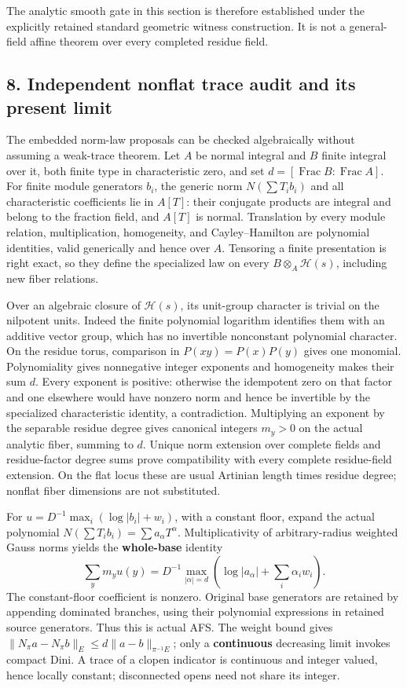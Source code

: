 \documentclass[
  10pt,
]{article}
\begin{document}
The analytic smooth gate in this section is therefore established under
the explicitly retained standard geometric witness construction. It is
not a general-field affine theorem over every completed residue field.

\subsection{8. Independent nonflat trace audit and its present
limit}\label{independent-nonflat-trace-audit-and-its-present-limit}

The embedded norm-law proposals can be checked algebraically without
assuming a weak-trace theorem. Let \(A\) be normal integral and \(B\)
finite integral over it, both finite type in characteristic zero, and
set \(d=[\operatorname{Frac}B:\operatorname{Frac}A]\). For finite module
generators \(b_i\), the generic norm \(N(\sum T_i b_i)\) and all
characteristic coefficients lie in \(A[T]\): their conjugate products
are integral and belong to the fraction field, and \(A[T]\) is normal.
Translation by every module relation, multiplication, homogeneity, and
Cayley--Hamilton are polynomial identities, valid generically and hence
over \(A\). Tensoring a finite presentation is right exact, so they
define the specialized law on every \(B\otimes_A\mathcal H(s)\),
including new fiber relations.

Over an algebraic closure of \(\mathcal H(s)\), its unit-group character
is trivial on the nilpotent units. Indeed the finite polynomial
logarithm identifies them with an additive vector group, which has no
invertible nonconstant polynomial character. On the residue torus,
comparison in \(P(xy)=P(x)P(y)\) gives one monomial. Polynomiality gives
nonnegative integer exponents and homogeneity makes their sum \(d\).
Every exponent is positive: otherwise the idempotent zero on that factor
and one elsewhere would have nonzero norm and hence be invertible by the
specialized characteristic identity, a contradiction. Multiplying an
exponent by the separable residue degree gives canonical integers
\(m_y>0\) on the actual analytic fiber, summing to \(d\). Unique norm
extension over complete fields and residue-factor degree sums prove
compatibility with every complete residue-field extension. On the flat
locus these are usual Artinian length times residue degree; nonflat
fiber dimensions are not substituted.

For \(u=D^{-1}\max_i(\log|b_i|+w_i)\), with a constant floor, expand the
actual polynomial \(N(\sum T_i b_i)=\sum a_\alpha T^\alpha\).
Multiplicativity of arbitrary-radius weighted Gauss norms yields the
\textbf{whole-base} identity
\[\sum_y m_yu(y)=D^{-1}\max_{|\alpha|=d}\left(\log|a_\alpha|+\sum_i\alpha_iw_i\right). \tag{8.1}\]
The constant-floor coefficient is nonzero. Original base generators are
retained by appending dominated branches, using their polynomial
expressions in retained source generators. Thus this is actual AFS. The
weight bound gives \(\|N_\pi a-N_\pi b\|_E\le d\|a-b\|_{\pi^{-1}E}\);
only a \textbf{continuous} decreasing limit invokes compact Dini. A
trace of a clopen indicator is continuous and integer valued, hence
locally constant; disconnected opens need not share its integer.
\end{document}
